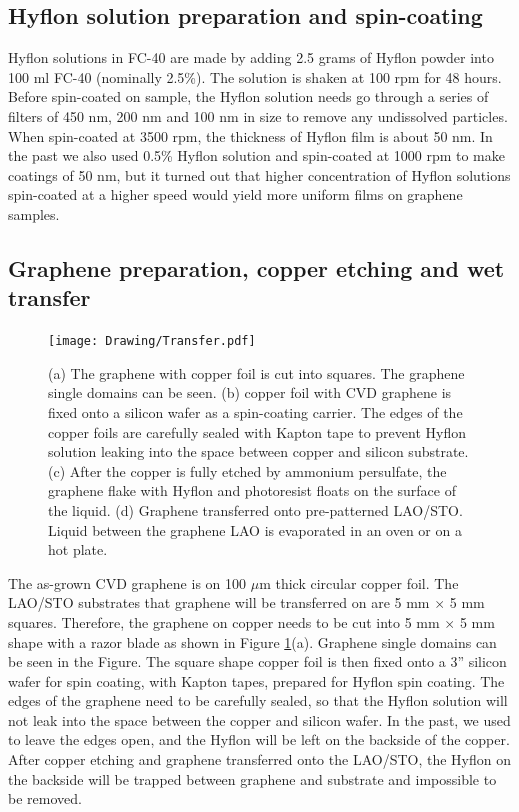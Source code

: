 \documentclass[pdflatex, sectionletters, 12pt]{pittetd}    %
\begin{document}
\subsection{Hyflon solution preparation and spin-coating} 


Hyflon solutions in FC-40 are made by adding 2.5 grams of Hyflon powder into 100 ml FC-40 (nominally 2.5\%). The solution is shaken at 100 rpm for 48 hours. Before spin-coated on sample, the Hyflon solution needs go through a series of filters of 450 nm, 200 nm and 100 nm in size to remove any undissolved particles. When spin-coated at 3500 rpm, the thickness of Hyflon film is about 50 nm. In the past we also used 0.5\% Hyflon solution and spin-coated at 1000 rpm to make coatings of 50 nm, but it turned out that higher concentration of Hyflon solutions spin-coated at a higher speed would yield more uniform films on graphene samples. 

\subsection{Graphene preparation, copper etching and wet transfer}

\begin{figure}[p]
	\centering
	\texttt{[image: Drawing/Transfer.pdf]}
	\caption{(a) The graphene with copper foil is cut into squares. The graphene single domains can be seen. (b) copper foil with CVD graphene is fixed onto a silicon wafer as a spin-coating carrier. The edges of the copper foils are carefully sealed with Kapton tape to prevent Hyflon solution leaking into the space between copper and silicon substrate. (c) After the copper is fully etched by ammonium persulfate, the graphene flake with Hyflon and photoresist floats on the surface of the liquid. (d) Graphene transferred onto pre-patterned LAO/STO. Liquid between the graphene LAO is evaporated in an oven or on a hot plate.}
	\label{FIG:Transfer}
\end{figure}

The as-grown CVD graphene is on 100 $\mu$m thick circular copper foil. The LAO/STO substrates that graphene will be transferred on are 5 mm $\times$ 5 mm squares. Therefore, the graphene on copper needs to be cut into 5 mm $\times$ 5 mm shape with a razor blade as shown in Figure \ref{FIG:Transfer}(a). Graphene single domains can be seen in the Figure. The square shape copper foil is then fixed onto a 3'' silicon wafer for spin coating, with Kapton tapes, prepared for Hyflon spin coating. The edges of the graphene need to be carefully sealed, so that the Hyflon solution will not leak into the space between the copper and silicon wafer. In the past, we used to leave the edges open, and the Hyflon will be left on the backside of the copper. After copper etching and graphene transferred onto the LAO/STO, the Hyflon on the backside will be trapped between graphene and substrate and impossible to be removed.
\end{document}
